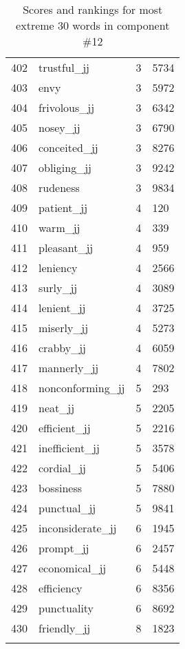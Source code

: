 \begin{longtable}[!htbp]{| rlr@{.}l |}
    402 & trustful\_jj & 3 & 5734 \\
    403 & envy & 3 & 5972 \\
    404 & frivolous\_jj & 3 & 6342 \\
    405 & nosey\_jj & 3 & 6790 \\
    406 & conceited\_jj & 3 & 8276 \\
    407 & obliging\_jj & 3 & 9242 \\
    408 & rudeness & 3 & 9834 \\
    409 & patient\_jj & 4 & 120 \\
    410 & warm\_jj & 4 & 339 \\
    411 & pleasant\_jj & 4 & 959 \\
    412 & leniency & 4 & 2566 \\
    413 & surly\_jj & 4 & 3089 \\
    414 & lenient\_jj & 4 & 3725 \\
    415 & miserly\_jj & 4 & 5273 \\
    416 & crabby\_jj & 4 & 6059 \\
    417 & mannerly\_jj & 4 & 7802 \\
    418 & nonconforming\_jj & 5 & 293 \\
    419 & neat\_jj & 5 & 2205 \\
    420 & efficient\_jj & 5 & 2216 \\
    421 & inefficient\_jj & 5 & 3578 \\
    422 & cordial\_jj & 5 & 5406 \\
    423 & bossiness & 5 & 7880 \\
    424 & punctual\_jj & 5 & 9841 \\
    425 & inconsiderate\_jj & 6 & 1945 \\
    426 & prompt\_jj & 6 & 2457 \\
    427 & economical\_jj & 6 & 5448 \\
    428 & efficiency & 6 & 8356 \\
    429 & punctuality & 6 & 8692 \\
    430 & friendly\_jj & 8 & 1823 \\
    \hline
    \caption{Scores and rankings for most extreme 30 words in component \#12} \\
\end{longtable}
